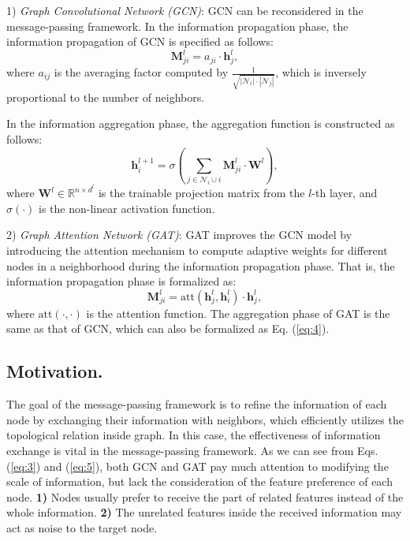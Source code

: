 1) \emph{Graph Convolutional Network (GCN)}: GCN can be reconsidered in the message-passing framework.
In the information propagation phase, the information propagation of GCN is specified as follows:
\begin{equation}
    \mathbf{M}_{j i}^l=a_{j i} \cdot \mathbf{h}_j^l,
    \label{eq:3}
\end{equation}
where $a_{ij}$ is the averaging factor computed by $\frac{1}{\sqrt{\left|\mathcal{N}_i\right| \cdot\left|\mathcal{N}_j\right|}}$, which is inversely proportional to the number of neighbors.

In the information aggregation phase, the aggregation function is constructed as follows:
\begin{equation}
    \mathbf{h}_i^{l+1}=\sigma\left(\sum_{j \in \mathcal{N}_i \cup i} \mathbf{M}_{j i}^l \cdot \mathbf{W}^l\right),
    \label{eq:4}
\end{equation}
where $\mathbf{W}^l \in \mathbb{R}^{n \times {d^{l}}}$ is the trainable projection matrix from the $l$-th layer, and $\sigma(\cdot)$ is the non-linear activation function.

2) \emph{Graph Attention Network (GAT)}: GAT improves the GCN model by introducing the attention mechanism to compute adaptive weights for different nodes in a neighborhood during the information propagation phase. 
That is, the information propagation phase is formalized as:
\begin{equation}
    \mathbf{M}_{j i}^l= \text{att} (\mathbf{h}_j^l, \mathbf{h}_i^l ) \cdot \mathbf{h}_j^l,
    \label{eq:5}
\end{equation}
where $\text{att}(\cdot, \cdot)$ is the attention function. 
The aggregation phase of GAT is the same as that of GCN, which can also be formalized as Eq. (\ref{eq:4}).

\subsection{Motivation.}
The goal of the message-passing framework is to refine the information of each node by exchanging their information with neighbors, which efficiently utilizes the topological relation inside graph. 
In this case, the effectiveness of information exchange is vital in the message-passing framework. 
As we can see from Eqs. (\ref{eq:3}) and (\ref{eq:5}), both GCN and GAT pay much attention to modifying the scale of information,
but lack the consideration of the feature preference of each node. 
\textbf{1)} Nodes usually prefer to receive the part of related features instead of the whole information. 
\textbf{2)} The unrelated features inside the received information may act as noise to the target node.

